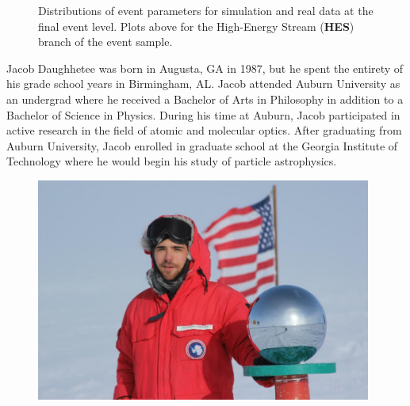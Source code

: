 \documentclass{gatech-thesis}
\begin{document}
\begin{figure}
\caption[Final Level HES Event Distributions]{Distributions of event parameters for simulation and real data at the final event level. Plots above for the High-Energy Stream (\textbf{HES}) branch of the event sample.} 
\label{fig:hes_final_level_distros}
\end{figure}

\begin{postliminary}

\begin{vita}
Jacob Daughhetee was born in Augusta, GA in 1987, but he spent the entirety of his grade school years in Birmingham, AL. Jacob attended Auburn University as an undergrad where he received a Bachelor of Arts in Philosophy in addition to a Bachelor of Science in Physics. During his time at Auburn, Jacob participated in active research in the field of atomic and molecular optics. After graduating from Auburn University, Jacob enrolled in graduate school at the Georgia Institute of Technology where he would begin his study of particle astrophysics.

\begin{figure}[ht]
  \begin{center}
    \includegraphics[width=0.98\textwidth,keepaspectratio]{HeroShot.jpg}
  \end{center}
  \label{fig:HeroShot}
\end{figure}

\end{vita}
\end{postliminary}
\end{document}
